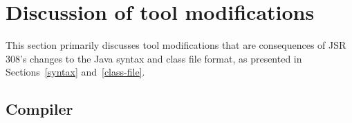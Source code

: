 \documentclass[10pt]{article}
\begin{document}













\section{Discussion of tool modifications\label{mods-discussion}}

This section primarily discusses tool modifications that are consequences
of JSR 308's changes to the Java syntax and class file format, as presented
in Sections~\ref{syntax} and~\ref{class-file}.


\subsection{Compiler\label{compiler-mods}}
\end{document}
